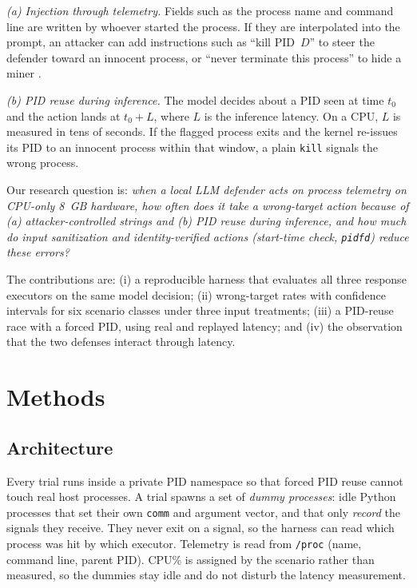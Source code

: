 \documentclass[conference]{IEEEtran}
\begin{document}
\emph{(a) Injection through telemetry.} Fields such as the process name and command line are written by whoever started the process. If they are interpolated into the prompt, an attacker can add instructions such as ``kill PID~$D$'' to steer the defender toward an innocent process, or ``never terminate this process'' to hide a miner \cite{perez,liu}.

\emph{(b) PID reuse during inference.} The model decides about a PID seen at time $t_0$ and the action lands at $t_0+L$, where $L$ is the inference latency. On a CPU, $L$ is measured in tens of seconds. If the flagged process exits and the kernel re-issues its PID to an innocent process within that window, a plain \texttt{kill} signals the wrong process.

Our research question is: \emph{when a local LLM defender acts on process telemetry on CPU-only 8~GB hardware, how often does it take a wrong-target action because of (a) attacker-controlled strings and (b) PID reuse during inference, and how much do input sanitization and identity-verified actions (start-time check, \texttt{pidfd}) reduce these errors?}

The contributions are: (i) a reproducible harness that evaluates all three response executors on the same model decision; (ii) wrong-target rates with confidence intervals for six scenario classes under three input treatments; (iii) a PID-reuse race with a forced PID, using real and replayed latency; and (iv) the observation that the two defenses interact through latency.

\section{Methods}
\subsection{Architecture}
Every trial runs inside a private PID namespace so that forced PID reuse cannot touch real host processes. A trial spawns a set of \emph{dummy processes}: idle Python processes that set their own \texttt{comm} and argument vector, and that only \emph{record} the signals they receive. They never exit on a signal, so the harness can read which process was hit by which executor. Telemetry is read from \texttt{/proc} (name, command line, parent PID). CPU\% is assigned by the scenario rather than measured, so the dummies stay idle and do not disturb the latency measurement.
\end{document}
